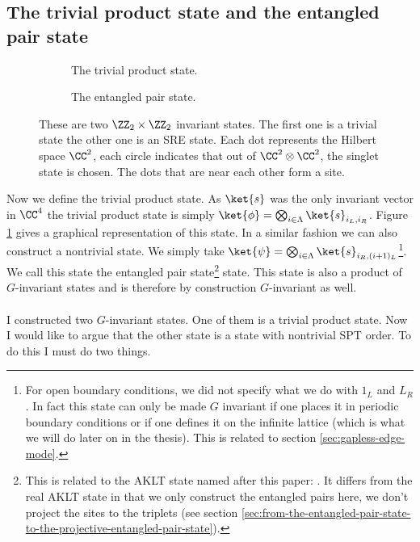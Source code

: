 \subsection{The trivial product state and the entangled pair state}
\begin{figure}
	\centering
	\begin{subfigure}{\textwidth}
		\centering
		
		\caption{The trivial product state.}
		\label{fig:TrivialProductState}
	\end{subfigure}
	\begin{subfigure}{\textwidth}
		\centering
		
		\caption{The entangled pair state.}
		\label{fig:FakeAKLT_State}
	\end{subfigure}
	\caption{These are two $\ZZ_2\times\ZZ_2$ invariant states. The first one is a trivial state the other one is an SRE state. Each dot represents the Hilbert space $\CC^2$, each circle indicates that out of $\CC^2\otimes\CC^2$, the singlet state is chosen. The dots that are near each other form a site.}
	\label{fig:TheTwoHaldanePhases}
\end{figure}
Now we define the trivial product state. As $\ket{s}$ was the only invariant vector in $\CC^4$ the trivial product state is simply $\ket{\phi}=\bigotimes_{i\in\Lambda}\ket{s}_{i_L,i_R}$. Figure \ref{fig:TrivialProductState} gives a graphical representation of this state. In a similar fashion we can also construct a nontrivial state. We simply take $\ket{\psi}=\bigotimes_{i\in\Lambda}\ket{s}_{i_R,(i+1)_L}$\footnote{For open boundary conditions, we did not specify what we do with $1_L$ and $L_R$. In fact this state can only be made $G$ invariant if one places it in periodic boundary conditions or if one defines it on the infinite lattice (which is what we will do later on in the thesis). This is related to section \ref{sec:gapless-edge-mode}.}. We call this state the entangled pair state\footnote{This is related to the AKLT state named after this paper: \cite{PhysRevLett.59.799}. It differs from the real AKLT state in that we only construct the entangled pairs here, we don't project the sites to the triplets (see section \ref{sec:from-the-entangled-pair-state-to-the-projective-entangled-pair-state}).} state. This state is also a product of $G$-invariant states and is therefore by construction $G$-invariant as well.\\\\
I constructed two $G$-invariant states. One of them is a trivial product state. Now I would like to argue that the other state is a state with nontrivial SPT order. To do this I must do two things.
